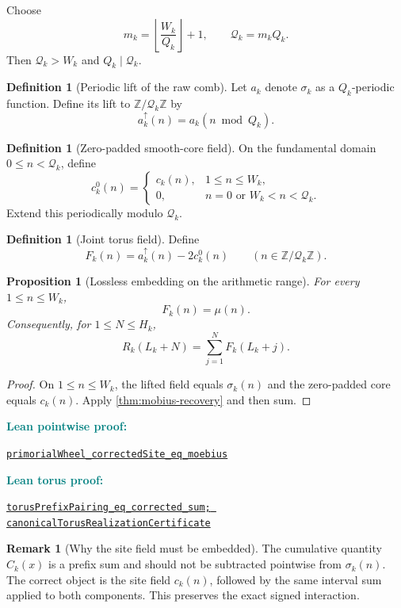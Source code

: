 \documentclass[11pt]{article}
\newtheorem{proposition}[theorem]{Proposition}
\theoremstyle{definition}
\newtheorem{definition}[theorem]{Definition}
\newtheorem{remark}[theorem]{Remark}
\newcommand{\Z}{\mathbb Z}
\newcommand{\leanxref}[3]{%
  \par\smallskip
  {\small\noindent\textcolor{teal}{\textbf{#1:}}\par
  \noindent\href{#3}{\nolinkurl{#2}}\par}
  \smallskip
}
\begin{document}
Choose
\[
m_k=\left\lfloor\frac{W_k}{Q_k}\right\rfloor+1,
\qquad
\mathcal Q_k=m_kQ_k.
\]
Then $\mathcal Q_k>W_k$ and $Q_k\mid\mathcal Q_k$.

\begin{definition}[Periodic lift of the raw comb]\label{def:raw-lift}
Let $a_k$ denote $\sigma_k$ as a $Q_k$-periodic function.  Define its lift to $\Z/\mathcal Q_k\Z$ by
\[
a_k^{\uparrow}(n)=a_k(n\bmod Q_k).
\]
\end{definition}

\begin{definition}[Zero-padded smooth-core field]\label{def:core-padding}
On the fundamental domain $0\le n<\mathcal Q_k$, define
\[
c_k^{0}(n)=
\begin{cases}
c_k(n),&1\le n\le W_k,\\
0,&n=0\text{ or }W_k<n<\mathcal Q_k.
\end{cases}
\]
Extend this periodically modulo $\mathcal Q_k$.
\end{definition}

\begin{definition}[Joint torus field]\label{def:joint-field}
Define
\[
F_k(n)=a_k^{\uparrow}(n)-2c_k^0(n)
\qquad(n\in\Z/\mathcal Q_k\Z).
\]
\end{definition}

\begin{proposition}[Lossless embedding on the arithmetic range]\label{prop:lossless}
For every $1\le n\le W_k$,
\[
F_k(n)=\mu(n).
\]
Consequently, for $1\le N\le H_k$,
\[
R_k(L_k+N)=\sum_{j=1}^{N}F_k(L_k+j).
\]
\end{proposition}

\begin{proof}
On $1\le n\le W_k$, the lifted field equals $\sigma_k(n)$ and the zero-padded core equals $c_k(n)$.  Apply \cref{thm:mobius-recovery} and then sum.
\end{proof}
\leanxref{Lean pointwise proof}{primorialWheel_correctedSite_eq_moebius}{https://github.com/OVVO-Financial/prime-wheel-mobius/blob/main/formalization/RHLean/Arithmetic/PrimeWheelMobiusRecovery.lean}
\leanxref{Lean torus proof}{torusPrefixPairing_eq_corrected_sum; canonicalTorusRealizationCertificate}{https://github.com/OVVO-Financial/prime-wheel-mobius/blob/main/formalization/RHLean/Analysis/PrimeWheelTorusRealization.lean}

\begin{remark}[Why the site field must be embedded]
The cumulative quantity $C_k(x)$ is a prefix sum and should not be subtracted pointwise from $\sigma_k(n)$.  The correct object is the site field $c_k(n)$, followed by the same interval sum applied to both components.  This preserves the exact signed interaction.
\end{remark}
\end{document}
